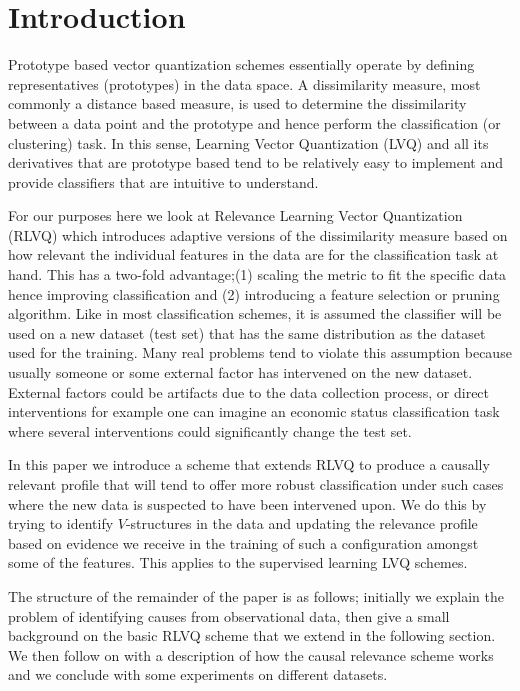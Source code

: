 \documentclass{esannV2}
\begin{document}
\section{Introduction}
\label{sec:Introduction}

Prototype based vector quantization schemes essentially operate by defining representatives (prototypes) in the data space. A dissimilarity measure, most commonly a distance based measure, is used to determine the dissimilarity between a data point and the prototype and hence perform the classification (or clustering) task. In this sense, Learning Vector Quantization (LVQ) and all its derivatives that are prototype based tend to be relatively easy to implement and provide classifiers that are intuitive to understand.

For our purposes here we look at Relevance Learning Vector Quantization (RLVQ)\cite{08} which introduces adaptive versions of the  dissimilarity measure based on how relevant the individual features in the data are for the classification task at hand. This has a two-fold advantage;(1) scaling the metric to fit the specific data hence improving classification and (2) introducing a feature selection or pruning algorithm. Like in most classification schemes, it is assumed the classifier will be used on a new dataset (test set) that has the same distribution as the dataset used for the training. Many real problems tend to violate this assumption because usually someone or some external factor has intervened on the new dataset. External factors could be artifacts due to the data collection process, or direct interventions for example one can imagine an economic status classification task where several interventions could significantly change the test set. 

In this paper we introduce a scheme that extends RLVQ to produce a causally relevant profile that will tend to offer more robust classification under such cases where the new data is suspected to have been intervened upon. We do this by trying to identify $V$-structures in the data and updating the relevance profile based on evidence we receive in the training of such a configuration amongst some of the features. This applies to the supervised learning LVQ schemes.

The structure of the remainder of the paper is as follows; initially we explain the problem of identifying causes from observational data, then give a small background on the basic RLVQ scheme that we extend in the following section. We then follow on with a description of how the causal relevance scheme works and we conclude with some experiments on different datasets.
\end{document}
